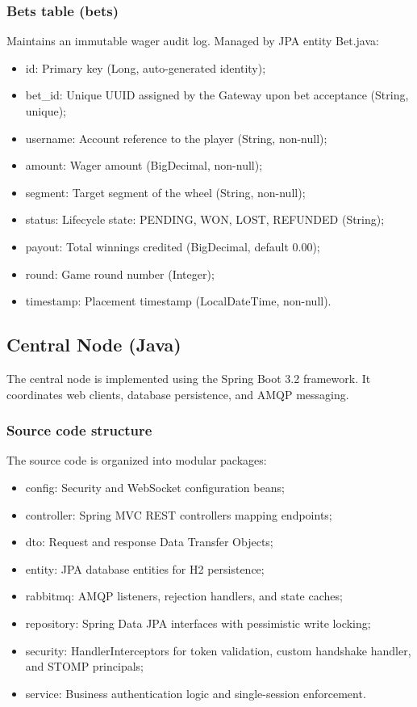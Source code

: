 \documentclass[12pt,a4paper]{article}
\begin{document}
\subsubsection{Bets table (bets)}
Maintains an immutable wager audit log. Managed by JPA entity Bet.java:
\begin{itemize}
    \item id: Primary key (Long, auto-generated identity);
    \item bet\_\allowbreak id: Unique UUID assigned by the Gateway upon bet acceptance (String, unique);
    \item username: Account reference to the player (String, non-null);
    \item amount: Wager amount (BigDecimal, non-null);
    \item segment: Target segment of the wheel (String, non-null);
    \item status: Lifecycle state: PENDING, WON, LOST, REFUNDED (String);
    \item payout: Total winnings credited (BigDecimal, default 0.00);
    \item round: Game round number (Integer);
    \item timestamp: Placement timestamp (LocalDateTime, non-null).
\end{itemize}

\subsection{Central Node (Java)}
The central node is implemented using the Spring Boot 3.2 framework. It coordinates web clients, database persistence, and AMQP messaging.

\subsubsection{Source code structure}
The source code is organized into modular packages:
\begin{itemize}
    \item config: Security and WebSocket configuration beans;
    \item controller: Spring MVC REST controllers mapping endpoints;
    \item dto: Request and response Data Transfer Objects;
    \item entity: JPA database entities for H2 persistence;
    \item rabbitmq: AMQP listeners, rejection handlers, and state caches;
    \item repository: Spring Data JPA interfaces with pessimistic write locking;
    \item security: HandlerInterceptors for token validation, custom handshake handler, and STOMP principals;
    \item service: Business authentication logic and single-session enforcement.
\end{itemize}
\end{document}
